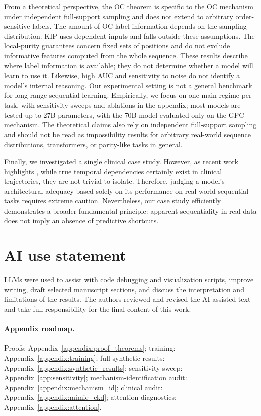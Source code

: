 \documentclass{article} %
\theoremstyle{plain}
\theoremstyle{definition}
\theoremstyle{remark}
\begin{document}
From a theoretical perspective, the OC theorem is specific to the OC mechanism under independent full-support sampling and does not extend to arbitrary order-sensitive labels. The amount of OC label information depends on the sampling distribution. KIP uses dependent inputs and falls outside these assumptions. The local-purity guarantees concern fixed sets of positions and do not exclude informative features computed from the whole sequence. These results describe where label information is available; they do not determine whether a model will learn to use it. Likewise, high AUC and sensitivity to noise do not identify a model’s internal reasoning. Our experimental setting is not a general benchmark for long-range sequential learning. Empirically, we focus on one main regime per task, with sensitivity sweeps and ablations in the appendix; most models are tested up to 27B parameters, with the 70B model evaluated only on the GPC mechanism. The theoretical claims also rely on independent full-support sampling and should not be read as impossibility results for arbitrary real-world sequence distributions, transformers, or parity-like tasks in general.

Finally, we investigated a single clinical case study. However, as recent work highlights \citep{edelman2026order_specific_ehr}, while true temporal dependencies certainly exist in clinical trajectories, they are not trivial to isolate. Therefore, judging a model's architectural adequacy based solely on its performance on real-world sequential tasks requires extreme caution. Nevertheless, our case study efficiently demonstrates a broader fundamental principle: apparent sequentiality in real data does not imply an absence of predictive shortcuts.

\section{AI use statement}
LLMs were used to assist with code debugging and visualization scripts, improve writing, draft selected manuscript sections, and discuss the interpretation and limitations of the results. The authors reviewed and revised the AI-assisted text and take full responsibility for the final content of this work.



\clearpage
\appendix

\paragraph{Appendix roadmap.}
Proofs: Appendix~\ref{appendix:proof_theorems}; training: Appendix~\ref{appendix:training}; full synthetic results: Appendix~\ref{appendix:synthetic_results}; sensitivity sweep: Appendix~\ref{app:sensitivity}; mechanism-identification audit: Appendix~\ref{appendix:mechanism_id}; clinical audit: Appendix~\ref{appendix:mimic_ckd}; attention diagnostics: Appendix~\ref{appendix:attention}.
\end{document}

